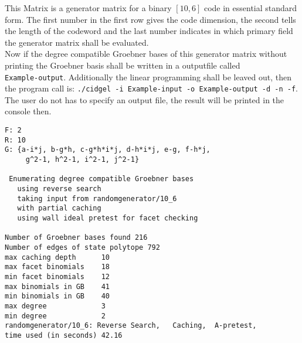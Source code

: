 This Matrix is a generator matrix for a binary $[10,6]$ code in essential standard form. 
The first number in the first row gives the code dimension, the second tells the length of the codeword and the last number indicates in which primary field the generator matrix shall be evaluated.\\

Now if the degree compatible Groebner bases of this generator  matrix without printing the Groebner basis shall be written in a outputfile called \\ \texttt{Example-output}. Additionally the linear programming shall be leaved out, then the program call is: \texttt{./cidgel -i Example-input -o Example-output -d -n -f}.
The user do not has to specify an output file, the result will be printed in the console then.

\newpage

 \begin{lstlisting}[basicstyle=\fontfamily{courier}\selectfont,language={}] %
% starting GB:
F: 2
R: 10
G: {a-i*j, b-g*h, c-g*h*i*j, d-h*i*j, e-g, f-h*j,
	 g^2-1, h^2-1, i^2-1, j^2-1}

 Enumerating degree compatible Groebner bases
   using reverse search
   taking input from randomgenerator/10_6
   with partial caching
   using wall ideal pretest for facet checking

Number of Groebner bases found 216
Number of edges of state polytope 792
max caching depth      10
max facet binomials    18
min facet binomials    12
max binomials in GB    41
min binomials in GB    40
max degree             3
min degree             2
randomgenerator/10_6: Reverse Search,   Caching,  A-pretest,
time used (in seconds) 42.16
\end{lstlisting}
  



